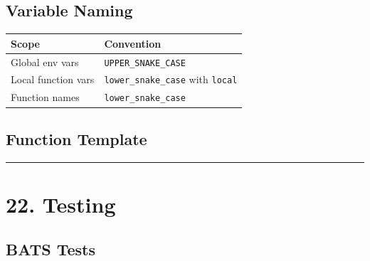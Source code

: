 \documentclass[
]{article}
\newenvironment{Shaded}{\begin{snugshade}}{\end{snugshade}}
\newcommand{\BuiltInTok}[1]{#1}
\newcommand{\CommentTok}[1]{\textcolor[rgb]{0.56,0.35,0.01}{\textit{#1}}}
\newcommand{\ControlFlowTok}[1]{\textcolor[rgb]{0.13,0.29,0.53}{\textbf{#1}}}
\newcommand{\DecValTok}[1]{\textcolor[rgb]{0.00,0.00,0.81}{#1}}
\newcommand{\FunctionTok}[1]{\textcolor[rgb]{0.13,0.29,0.53}{\textbf{#1}}}
\newcommand{\KeywordTok}[1]{\textcolor[rgb]{0.13,0.29,0.53}{\textbf{#1}}}
\newcommand{\NormalTok}[1]{#1}
\newcommand{\OperatorTok}[1]{\textcolor[rgb]{0.81,0.36,0.00}{\textbf{#1}}}
\newcommand{\StringTok}[1]{\textcolor[rgb]{0.31,0.60,0.02}{#1}}
\newcommand{\VariableTok}[1]{\textcolor[rgb]{0.00,0.00,0.00}{#1}}
\newcounter{none} %
\begin{document}
\subsection{Variable Naming}\label{variable-naming}

{\def\LTcaptype{none} %
\begin{longtable}[]{@{}ll@{}}
\toprule\noalign{}
Scope & Convention \\
\midrule\noalign{}
\endhead
\bottomrule\noalign{}
\endlastfoot
Global env vars & \texttt{UPPER\_SNAKE\_CASE} \\
Local function vars & \texttt{lower\_snake\_case} with \texttt{local} \\
Function names & \texttt{lower\_snake\_case} \\
\end{longtable}
}

\subsection{Function Template}\label{function-template}

\begin{Shaded}
\end{Shaded}

\begin{center}\rule{0.5\linewidth}{0.5pt}\end{center}

\section{22. Testing}\label{testing}

\subsection{BATS Tests}\label{bats-tests}
\end{document}
